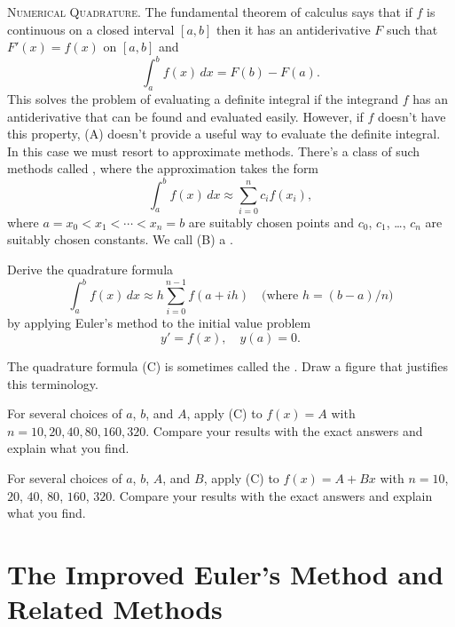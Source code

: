\begin{exerciselist}
\item\label{exer:3.1.23}{\scshape Numerical Quadrature.}
The fundamental theorem of calculus says that if $f$
is continuous on a closed interval $[a,b]$ then it has an
antiderivative $F$ such that $F'(x)=f(x)$ on $[a,b]$  and
\[
\int_a^bf(x)\,dx=F(b)-F(a).\tag{A}
\]
This solves the problem of evaluating a definite integral if
the integrand $f$ has an antiderivative that can be found and
evaluated easily. However, if $f$
doesn't have this property, (A) doesn't  provide a useful
way to evaluate the definite integral. In this case we must resort to
approximate methods. There's a class of such methods called
, where the approximation takes the
form
\[
\int_a^bf(x)\,dx\approx \sum_{i=0}^n c_if(x_i),\tag{B}
\]
where $a=x_0<x_1<\cdots<x_n=b$ are suitably chosen points and
$c_0$, $c_1$, \dots, $c_n$
are suitably chosen constants. We call (B)  a .
\begin{alist}
\item %
Derive the quadrature formula
\[
\int_a^bf(x)\,dx\approx
h\sum_{i=0}^{n-1}f(a+ih)\quad\text{(where $h=(b-a)/n$)}\tag{C}
\]
by applying Euler's method to the initial value problem
\[
y'=f(x),\quad y(a)=0.
\]
\item %
The quadrature formula (C) is sometimes called the . Draw a figure that justifies this terminology.
\item %
\Lex
For several choices of $a$, $b$, and $A$,
 apply (C) to $f(x)=A$ with $n = 10,20,40,80,160,320$.
Compare your results with the exact answers
and explain what you find.
\item %
\Lex
For several choices of $a$, $b$,  $A$, and $B$,
 apply (C) to $f(x)=A+Bx$ with $n=10$, $20$, $40$, $80$, $160$, $320$.
 Compare your results with the exact answers
and explain what you find.
\end{alist}
\end{exerciselist}


\section{The Improved Euler's Method and Related Methods}
\label{sec:improved_euler}

